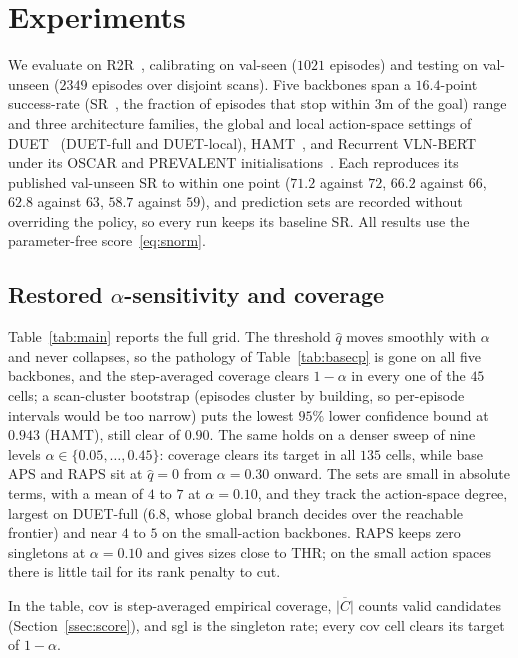 \section{Experiments}
\label{sec:exp}
We evaluate on R2R~\cite{anderson2018r2r}, calibrating on val-seen
($1021$ episodes) and testing on val-unseen ($2349$ episodes over
disjoint scans). Five backbones span a $16.4$-point success-rate
(SR~\cite{anderson2018spl}, the fraction of episodes that stop within $3$m of
the goal) range and three architecture families, the global
and local action-space settings of DUET~\cite{chen2022duet} (DUET-full and
DUET-local), HAMT~\cite{chen2021hamt}, and Recurrent VLN-BERT under its OSCAR
and PREVALENT initialisations~\cite{hong2021vlnbert}. Each reproduces its
published val-unseen SR to within one point ($71.2$ against $72$, $66.2$
against $66$, $62.8$ against $63$, $58.7$ against $59$), and prediction sets
are recorded without overriding the policy, so every run keeps its baseline
SR. All results use the parameter-free score~\eqref{eq:snorm}.

\subsection{Restored $\alpha$-sensitivity and coverage}
\label{ssec:main}
Table~\ref{tab:main} reports the full grid. The threshold $\hat q$ moves
smoothly with $\alpha$ and never collapses, so the pathology of
Table~\ref{tab:basecp} is gone on all five backbones, and the step-averaged
coverage clears $1-\alpha$ in every one of the $45$ cells; a scan-cluster
bootstrap (episodes cluster by building, so per-episode intervals would be
too narrow) puts the lowest $95\%$ lower confidence bound at $0.943$ (HAMT),
still clear of $0.90$. The same holds on a denser sweep of nine levels
$\alpha\in\{0.05,\dots,0.45\}$: coverage clears its target in all $135$
cells, while base APS and RAPS sit at $\hat q=0$ from $\alpha=0.30$ onward.
The sets are small
in absolute terms, with a mean of $4$ to $7$ at $\alpha = 0.10$, and they
track the action-space degree, largest on DUET-full ($6.8$, whose global
branch decides over the reachable frontier) and near $4$ to $5$ on the
small-action backbones. RAPS keeps zero singletons at $\alpha = 0.10$ and
gives sizes close to THR; on the small action spaces there is little tail
for its rank penalty to cut.


In the table, cov is step-averaged empirical coverage, $\overline{|C|}$
counts valid candidates (Section~\ref{ssec:score}), and sgl is the singleton
rate; every cov cell clears its target of $1-\alpha$.

